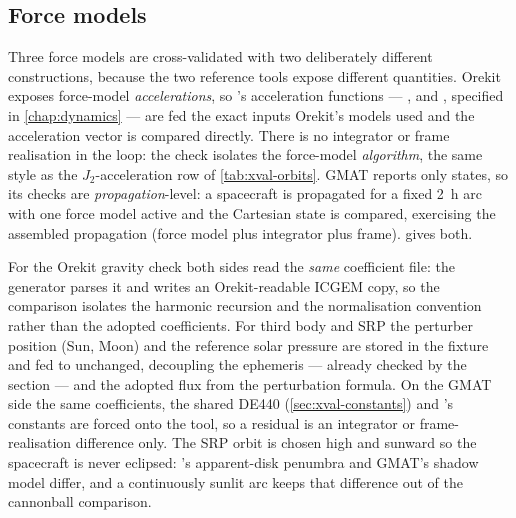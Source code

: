 \subsection{Force models}
\label{sec:xval-forces}

Three force models are cross-validated with two deliberately different
constructions, because the two reference tools expose different quantities.
Orekit exposes force-model \emph{accelerations}, so \lupnt{}'s acceleration
functions --- ,  and
, specified in \cref{chap:dynamics} --- are fed
the exact inputs Orekit's models used and the acceleration vector is compared
directly. There is no integrator or frame realisation in the loop: the check
isolates the force-model \emph{algorithm}, the same style as the
$J_2$-acceleration row of \cref{tab:xval-orbits}. GMAT reports only states, so
its checks are \emph{propagation}-level: a spacecraft is propagated for a fixed
\SI{2}{\hour} arc with one force model active and the Cartesian state is
compared, exercising the assembled propagation (force model plus integrator plus
frame).  gives both.

For the Orekit gravity check both sides read the \emph{same} \lupnt{} 
coefficient file: the generator parses it and writes an Orekit-readable ICGEM
copy, so the comparison isolates the harmonic recursion and the normalisation
convention rather than the adopted coefficients. For third body and SRP the
perturber position (Sun, Moon) and the reference solar pressure are stored in
the fixture and fed to \lupnt{} unchanged, decoupling the ephemeris --- already
checked by the  section --- and the adopted flux from the
perturbation formula. On the GMAT side the same coefficients, the shared DE440
(\cref{sec:xval-constants}) and \lupnt{}'s constants are forced onto the tool, so
a residual is an integrator or frame-realisation difference only. The SRP orbit
is chosen high and sunward so the spacecraft is never eclipsed: \lupnt{}'s
apparent-disk penumbra and GMAT's shadow model differ, and a continuously sunlit
arc keeps that difference out of the cannonball comparison.

